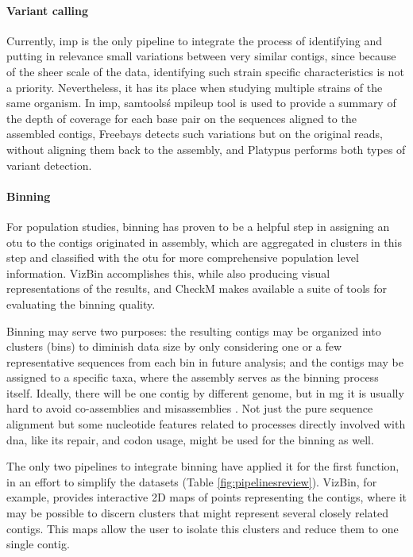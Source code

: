 \documentclass[
  oneside,
  11pt, a4paper,
  footinclude=true,
  headinclude=true,
  cleardoublepage=empty
]{scrbook}
\begin{document}
    \paragraph{Variant calling}
    
    Currently, \gls{imp} is the only pipeline to integrate the process of identifying and putting in relevance small variations between very similar contigs, since because of the sheer scale of the data, identifying such strain specific characteristics is not a priority. Nevertheless, it has its place when studying multiple strains of the same organism. In \gls{imp}, samtools\'s mpileup tool is used to provide a summary of the depth of coverage for each base pair on the sequences aligned to the assembled contigs, Freebays detects such variations but on the original reads, without aligning them back to the assembly, and Platypus performs both types of variant detection.
    
    \paragraph{Binning}
    
    For population studies, binning has proven to be a helpful step in assigning an \gls{otu} to the contigs originated in assembly, which are aggregated in clusters in this step and classified with the \gls{otu} for more comprehensive population level information. VizBin \citep{laczny2015vizbin} accomplishes this, while also producing visual representations of the results, and CheckM \citep{parks2015checkm} makes available a suite of tools for evaluating the binning quality.
    
    Binning may serve two purposes: the resulting contigs may be organized into clusters (bins) to diminish data size by only considering one or a few representative sequences from each bin in future analysis; and the contigs may be assigned to a specific taxa, where the assembly serves as the binning process itself. Ideally, there will be one contig by different genome, but in \gls{mg} it is usually hard to avoid co-assemblies and misassemblies \citep{Kunin2008}. Not just the pure sequence alignment but some nucleotide features related to processes directly involved with \gls{dna}, like its repair, and codon usage, might be used for the binning as well.
    
    The only two pipelines to integrate binning have applied it for the first function, in an effort to simplify the datasets (Table \ref{fig:pipelinesreview}). VizBin, for example, provides interactive 2D maps of points representing the contigs, where it may be possible to discern clusters that might represent several closely related contigs. This maps allow the user to isolate this clusters and reduce them to one single contig.
    
\end{document}
